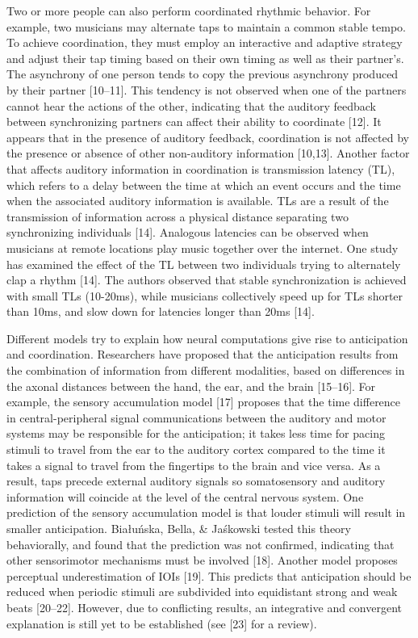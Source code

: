 \documentclass{report}
\begin{document}
Two or more people can also perform coordinated rhythmic behavior. For example, two musicians may alternate taps to maintain a common stable tempo. To achieve coordination, they must employ an interactive and adaptive strategy and adjust their tap timing based on their own timing as well as their partner's. The asynchrony of one person tends to copy the previous asynchrony produced by their partner [10–11]. This tendency is not observed when one of the partners cannot hear the actions of the other, indicating that the auditory feedback between synchronizing partners can affect their ability to coordinate [12]. It appears that in the presence of auditory feedback, coordination is not affected by the presence or absence of other non-auditory information [10,13]. Another factor that affects auditory information in coordination is transmission latency (TL), which refers to a delay between the time at which an event occurs and the time when the associated auditory information is available. TLs are a result of the transmission of information across a physical distance separating two synchronizing individuals [14]. Analogous latencies can be observed when musicians at remote locations play music together over the internet. One study has examined the effect of the TL between two individuals trying to alternately clap a rhythm [14]. The authors observed that stable synchronization is achieved with small TLs (10-20ms), while musicians collectively speed up for TLs shorter than 10ms, and slow down for latencies longer than 20ms [14].

Different models try to explain how neural computations give rise to anticipation and coordination. Researchers have proposed that the anticipation results from the combination of information from different modalities, based on differences in the axonal distances between the hand, the ear, and the brain [15–16]. For example, the sensory accumulation model [17] proposes that the time difference in central-peripheral signal communications between the auditory and motor systems may be responsible for the anticipation; it takes less time for pacing stimuli to travel from the ear to the auditory cortex compared to the time it takes a signal to travel from the fingertips to the brain and vice versa. As a result, taps precede external auditory signals so somatosensory and auditory information will coincide at the level of the central nervous system. One prediction of the sensory accumulation model is that louder stimuli will result in smaller anticipation. Białuńska, Bella, \& Jaśkowski tested this theory behaviorally, and found that the prediction was not confirmed, indicating that other sensorimotor mechanisms must be involved [18]. Another model proposes perceptual underestimation of IOIs [19]. This predicts that anticipation should be reduced when periodic stimuli are subdivided into equidistant strong and weak beats [20–22]. However, due to conflicting results, an integrative and convergent explanation is still yet to be established (see [23] for a review).
\end{document}
